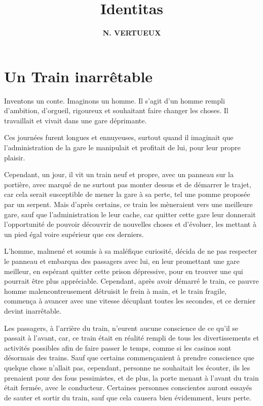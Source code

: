 \documentclass[twocolumn, french]{article}
\author{\large{\textbf{N. VERTUEUX}}}
\title{
  \fontsize{30pt}{36pt}\selectfont \textbf{Identitas}
}
\begin{document}
\maketitle
\section*{Un Train inarrêtable} 
Inventons un conte. Imaginons un homme. Il s'agit d'un homme rempli d'ambition, d'orgueil, rigoureux et 
souhaitant faire changer les choses. Il travaillait et vivait dans une gare déprimante. 

Ces journées furent longues et ennuyeuses, surtout quand il imaginait que l'administration de la gare le 
manipulait et profitait de lui, pour leur propre plaisir. 

Cependant, un jour, il vit un train neuf et propre, avec un panneau sur la portière, avec marqué de ne surtout pas 
monter dessus et de démarrer le trajet, car cela serait susceptible de mener la gare à sa perte, tel une pomme 
proposée par un serpent. Mais d'après certains, ce train les mèneraient vers une meilleure gare, sauf que 
l'administration le leur cache, car quitter cette gare leur donnerait l'opportunité de pouvoir découvrir de nouvelles 
choses et d'évoluer, les mettant à un pied égal voire supérieur que ces derniers.   

L'homme, malmené et soumis à sa maléfique curiosité, décida de ne pas respecter le panneau 
et embarqua des passagers avec lui, en leur promettant une gare meilleur, en espérant quitter 
cette prison dépressive, pour en trouver une qui pourrait être plus appréciable. Cependant, après 
avoir démarré le train, ce pauvre homme malencontreusement détruisit le frein à main, et le train fragile, 
commença à avancer avec une vitesse décuplant toutes les secondes, et ce dernier devint inarrêtable. 

Les passagers, à l'arrière du train, n'eurent aucune conscience de ce qu'il se passait à l'avant, car,
ce train était en réalité rempli de tous les divertissements et activités possibles afin de faire passer le temps, 
comme si les casinos sont désormais des trains.
Sauf que certains commençanient à prendre conscience que quelque chose n'allait pas, cependant, personne ne 
souhaitait les écouter, ils les prenaient pour des fous pessimistes, et de plus, la porte menant à l'avant du train 
était fermée, avec le conducteur. Certaines personnes conscientes auront essayés de sauter et sortir du train, sauf 
que cela causera bien évidemment, leurs perte.
\end{document}
